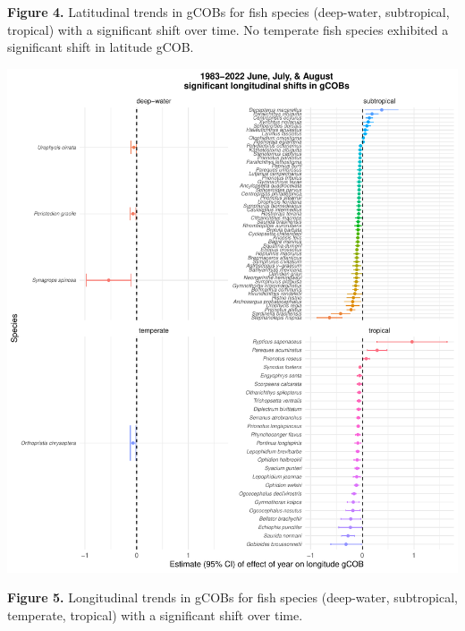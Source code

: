 \documentclass[
  letterpaper,
  DIV=11,
  numbers=noendperiod]{scrartcl}
\begin{document}
\textbf{Figure 4.} Latitudinal trends in gCOBs for fish species
(deep-water, subtropical, tropical) with a significant shift over time.
No temperate fish species exhibited a significant shift in latitude
gCOB.

\includegraphics{9_westernGoM_summer_files/figure-pdf/Fig_5-1.pdf}

\textbf{Figure 5.} Longitudinal trends in gCOBs for fish species
(deep-water, subtropical, temperate, tropical) with a significant shift
over time.
\end{document}
